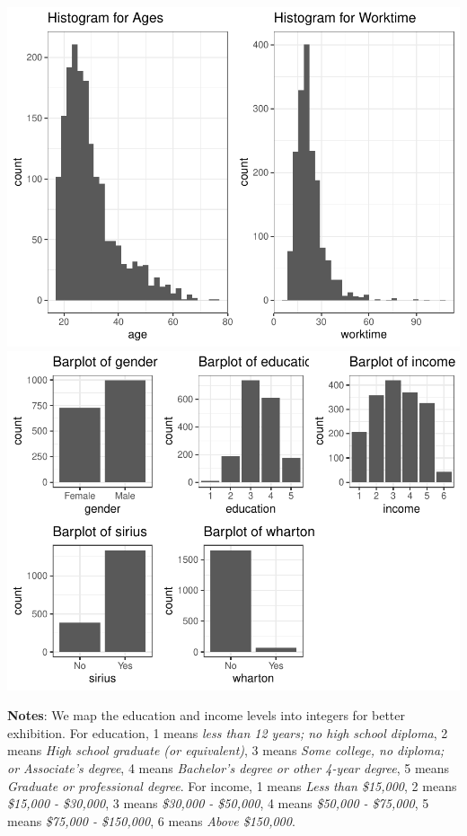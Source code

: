 \documentclass[
  12pt,
]{article}
\begin{document}
\includegraphics{hw1_sol_files/figure-latex/unnamed-chunk-3-1.pdf}
\includegraphics{hw1_sol_files/figure-latex/unnamed-chunk-3-2.pdf}

\textbf{Notes}: We map the education and income levels into integers for
better exhibition. For education, 1 means
\textit {less than 12 years; no high school diploma}, 2 means
\textit{   
High school graduate (or equivalent)}, 3 means
\textit{Some college, no diploma; or Associate’s degree}, 4 means
\textit{Bachelor’s degree or other 4-year degree}, 5 means \textit{    
Graduate or professional degree}. For income, 1 means
\textit{Less than \$15,000}, 2 means \textit{ 
\$15,000 - \$30,000}, 3 means \textit{\$30,000 - \$50,000}, 4 means
\textit{    
\$50,000 - \$75,000}, 5 means \textit{
\$75,000 - \$150,000}, 6 means \textit{Above \$150,000}.
\end{document}
